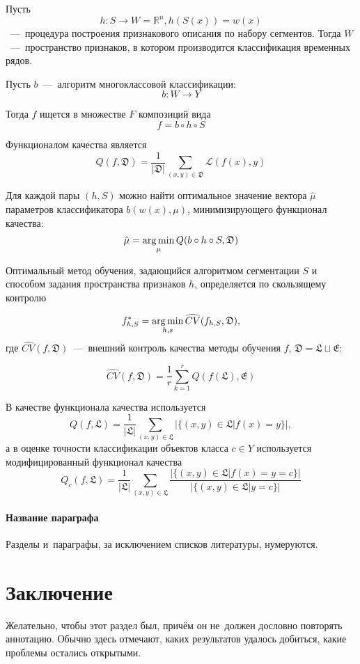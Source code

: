 \documentclass[12pt, twoside]{article}
\begin{document}
Пусть $$h:S\rightarrow W = \mathds{R}^n, h(S(x))=w(x)$$~---~процедура построения признакового описания по набору сегментов. Тогда $W$~---~пространство признаков, в котором производится классификация временных рядов.

Пусть $b$~---~алгоритм многоклассовой классификации: $$b:W\rightarrow Y$$

Тогда $f$ ищется в множестве $F$ композиций вида $$f=b\circ h\circ S$$

Функционалом качества является $$Q(f,\mathfrak{D})=\frac{1}{|\mathfrak{D}|}\sum\limits_{(x,y)\in\mathfrak{D}}\mathscr{L}(f(x),y)$$

Для каждой пары $(h,S)$ можно найти оптимальное значение вектора $\hat\mu$ параметров классификатора $b(w(x),\mu)$, минимизирующего функционал качества: $$\hat\mu=\argmin_\mu Q(b\circ h\circ S,\mathfrak{D})$$

Оптимальный метод обучения, задающийся алгоритмом сегментации $S$ и способом задания пространства признаков $h$, определяется по скользящему контролю

$$f_{h,S}^*=\argmin\limits_{h,s}\widehat{CV}(f_{h,S},\mathfrak{D}),$$ где $\widehat{CV}(f,\mathfrak{D})$~---~внешний контроль качества методы обучения $f$, $\mathfrak{D}=\mathfrak{L}\sqcup\mathfrak{E}$:
 
$$\widehat{CV}(f, \mathfrak{D})=\frac{1}{r}\sum\limits_{k=1}^r Q(f(\mathfrak{L}),\mathfrak{E})$$

В качестве функционала качества используется $$Q(f,\mathfrak{L})=\frac{1}{|\mathfrak{L}|}\sum\limits_{(x,y)\in\mathfrak{L}}|\{(x,y)\in\mathfrak{L}|f(x)=y\}|,$$ а в оценке точности классификации объектов класса $c\in Y$ используется модифицированный функционал качества $$Q_c(f,\mathfrak{L})=\frac{1}{|\mathfrak{L}|}\sum\limits_{(x,y)\in\mathfrak{L}}\frac{|\{(x,y)\in\mathfrak{L}|f(x)=y=c\}|}{|\{(x,y)\in\mathfrak{L}|y=c\}|}$$





\paragraph{Название параграфа}
Разделы и~параграфы, за исключением списков литературы, нумеруются.

\section{Заключение}
Желательно, чтобы этот раздел был, причём он не~должен дословно повторять аннотацию.
Обычно здесь отмечают, каких результатов удалось добиться, какие проблемы остались открытыми.
\end{document}
